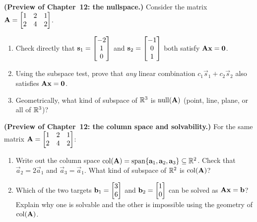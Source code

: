 \begin{exercise}\label{ch11:ex-preview-nullspace}
\textbf{(Preview of Chapter~12: the nullspace.)}
Consider the matrix $\mathbf{A} = \begin{bmatrix} 1 & 2 & 1 \\ 2 & 4 & 2 \end{bmatrix}$.
\begin{enumerate}[label=(\alph*)]
  \item Check directly that $\mathbf{s}_1 = \begin{bmatrix}-2\\1\\0\end{bmatrix}$ and $\mathbf{s}_2 = \begin{bmatrix}-1\\0\\1\end{bmatrix}$ both satisfy $\mathbf{A}\mathbf{x} = \mathbf{0}$.
  \item Using the subspace test, prove that \emph{any} linear combination $c_1\vec{s}_1 + c_2\vec{s}_2$ also satisfies $\mathbf{A}\mathbf{x} = \mathbf{0}$.
  \item Geometrically, what kind of subspace of $\mathbb{R}^3$ is $\operatorname{null}(\mathbf{A})$ (point, line, plane, or all of $\mathbb{R}^3$)?
\end{enumerate}
\end{exercise}

\begin{exercise}\label{ch11:ex-preview-colspace}
\textbf{(Preview of Chapter~12: the column space and solvability.)}
For the same matrix $\mathbf{A} = \begin{bmatrix} 1 & 2 & 1 \\ 2 & 4 & 2 \end{bmatrix}$:
\begin{enumerate}[label=(\alph*)]
  \item Write out the column space $\operatorname{col}(\mathbf{A}) = \operatorname{span}\{\mathbf{a}_1,\mathbf{a}_2,\mathbf{a}_3\} \subseteq \mathbb{R}^2$. Check that $\vec{a}_2 = 2\vec{a}_1$ and $\vec{a}_3 = \vec{a}_1$. What kind of subspace of $\mathbb{R}^2$ is $\operatorname{col}(\mathbf{A})$?
  \item Which of the two targets $\mathbf{b}_1 = \begin{bmatrix}3\\6\end{bmatrix}$ and $\mathbf{b}_2 = \begin{bmatrix}1\\0\end{bmatrix}$ can be solved as $\mathbf{A}\mathbf{x} = \mathbf{b}$? Explain why one is solvable and the other is impossible using the geometry of $\operatorname{col}(\mathbf{A})$.
\end{enumerate}
\end{exercise}

